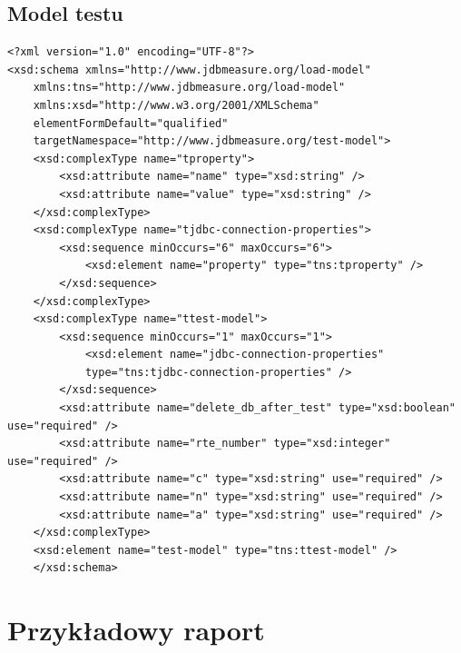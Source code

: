 \subsection{Model testu}
\begin{Verbatim}
<?xml version="1.0" encoding="UTF-8"?>
<xsd:schema xmlns="http://www.jdbmeasure.org/load-model"
	xmlns:tns="http://www.jdbmeasure.org/load-model"
	xmlns:xsd="http://www.w3.org/2001/XMLSchema"
	elementFormDefault="qualified"
	targetNamespace="http://www.jdbmeasure.org/test-model">
	<xsd:complexType name="tproperty">
		<xsd:attribute name="name" type="xsd:string" />
		<xsd:attribute name="value" type="xsd:string" />
	</xsd:complexType>
	<xsd:complexType name="tjdbc-connection-properties">
		<xsd:sequence minOccurs="6" maxOccurs="6">
			<xsd:element name="property" type="tns:tproperty" />
		</xsd:sequence>
	</xsd:complexType>
	<xsd:complexType name="ttest-model">
		<xsd:sequence minOccurs="1" maxOccurs="1">
			<xsd:element name="jdbc-connection-properties" 
			type="tns:tjdbc-connection-properties" />
		</xsd:sequence>
		<xsd:attribute name="delete_db_after_test" type="xsd:boolean" use="required" />
		<xsd:attribute name="rte_number" type="xsd:integer" use="required" />
		<xsd:attribute name="c" type="xsd:string" use="required" />
		<xsd:attribute name="n" type="xsd:string" use="required" />
		<xsd:attribute name="a" type="xsd:string" use="required" />
	</xsd:complexType>
	<xsd:element name="test-model" type="tns:ttest-model" />
	</xsd:schema>
\end{Verbatim}
	
\section{Przykładowy raport}\label{sect:raportexample}

